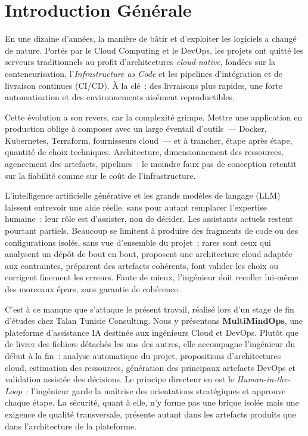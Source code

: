 \chapter*{Introduction Générale}
\adjustmtc
\thispagestyle{MyStyle}

En une dizaine d'années, la manière de bâtir et d'exploiter les logiciels a changé de
nature. Portés par le Cloud Computing et le DevOps, les projets ont quitté les serveurs
traditionnels au profit d'architectures \textit{cloud-native}, fondées sur la
conteneurisation, l'\textit{Infrastructure as Code} et les pipelines d'intégration et de
livraison continues (CI/CD). À la clé~: des livraisons plus rapides, une forte automatisation
et des environnements aisément reproductibles.

Cette évolution a son revers, car la complexité grimpe. Mettre une application en production
oblige à composer avec un large éventail d'outils~--- Docker, Kubernetes, Terraform,
fournisseurs cloud~--- et à trancher, étape après étape, quantité de choix techniques.
Architecture, dimensionnement des ressources, agencement des artefacts, pipelines~: le moindre
faux pas de conception retentit sur la fiabilité comme sur le coût de l'infrastructure.

L'intelligence artificielle générative et les grands modèles de langage (LLM) laissent
entrevoir une aide réelle, sans pour autant remplacer l'expertise humaine~: leur rôle est
d'assister, non de décider. Les assistants actuels restent pourtant partiels. Beaucoup se
limitent à produire des fragments de code ou des configurations isolés, sans vue d'ensemble
du projet~; rares sont ceux qui analysent un dépôt de bout en bout, proposent une architecture
cloud adaptée aux contraintes, préparent des artefacts cohérents, font valider les choix ou
corrigent finement les erreurs. Faute de mieux, l'ingénieur doit recoller lui-même des
morceaux épars, sans garantie de cohérence.

C'est à ce manque que s'attaque le présent travail, réalisé lors d'un stage de fin d'études
chez Talan Tunisie Consulting. Nous y présentons \textbf{MultiMindOps}, une plateforme
d'assistance IA destinée aux ingénieurs Cloud et DevOps. Plutôt que de livrer des fichiers
détachés les uns des autres, elle accompagne l'ingénieur du début à la fin~: analyse
automatique du projet, propositions d'architectures cloud, estimation des ressources,
génération des principaux artefacts DevOps et validation assistée des décisions. Le principe
directeur en est le \textit{Human-in-the-Loop}~: l'ingénieur garde la maîtrise des
orientations stratégiques et approuve chaque étape. La sécurité, quant à elle, n'y forme pas
une brique isolée mais une exigence de qualité transversale, présente autant dans les
artefacts produits que dans l'architecture de la plateforme.

